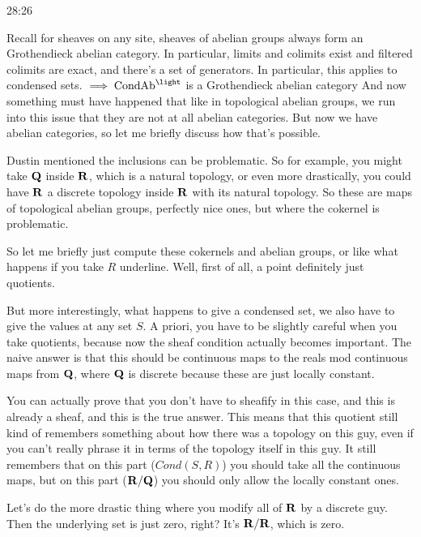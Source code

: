 \begin{example}
\begin{unfinished}{28:26}
\begin{remark}
\begin{remark}
Recall for sheaves on any site, sheaves of abelian groups always form an Grothendieck abelian category. In particular, limits and colimits exist and filtered colimits are exact, and there's a set of generators. 
In particular, this applies to condensed sets.
$\implies \Cond\Ab^\light$ is a Grothendieck abelian category
And now something must have happened that like in topological abelian groups, we run into this issue that they are not at all abelian categories. But now we have abelian categories, so let me briefly discuss how that's possible.

\begin{example}


Dustin mentioned the inclusions can be problematic. So for example, you might take $\mathbf Q$ inside $\mathbf R$, which is a natural topology, or even more drastically, you could have $\mathbf R$ a discrete topology inside $\mathbf R$ with its natural topology. So these are maps of topological abelian groups, perfectly nice ones, but where the cokernel is problematic.

So let me briefly just compute these cokernels and abelian groups, 
or like what happens if you take $R$ underline. Well, first of all, a point definitely just quotients.

But more interestingly, what happens to give a condensed set, we also have to give the values at any set $S$. A priori, you have to be slightly careful when you take quotients, because now the sheaf condition actually becomes important. The naive answer is that this should be continuous maps to the reals mod continuous maps from $\mathbf Q$, where $\mathbf Q$ is discrete because these are just locally constant.

You can actually prove that you don't have to sheafify in this case, and this is already a sheaf, and this is the true answer. This means that this quotient still kind of remembers something about how there was a topology on this guy, even if you can't really phrase it in terms of the topology itself in this guy. It still remembers that on this part ($Cond(S,R)$) you should take all the continuous maps, but on this part ($\mathbf R/\mathbf Q$) you should only allow the locally constant ones.

Let's do the more drastic thing where you modify all of $\mathbf R$ by a discrete guy. Then the underlying set is just zero, right? It's $\mathbf R/\mathbf R$, which is zero.



\end{example}
\end{remark}
\end{remark}
\end{unfinished}
\end{example}
